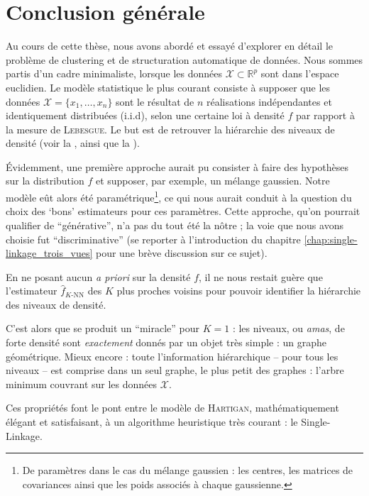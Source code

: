 \chapter{Conclusion générale}
\label{chap:conclusion}

Au cours de cette thèse, nous avons abordé et essayé d'explorer en détail le problème de clustering et de structuration automatique de données.
Nous sommes partis d'un cadre minimaliste, lorsque les données $\mathcal X \subset \mathbb R^p$ sont dans l'espace euclidien. Le modèle statistique le plus courant consiste à supposer que les données $\mathcal X = \bigl\{ x_1, \ldots , x_n \bigr\}$ sont le résultat de $n$ réalisations indépendantes et identiquement distribuées (i.i.d), selon une certaine loi à densité $f$ par rapport à la mesure de \textsc{Lebesgue}.
Le but est de retrouver la hiérarchie des niveaux de densité (voir la , ainsi que la ).

Évidemment, une première approche aurait pu consister à faire des hypothèses sur la distribution $f$ et supposer, par exemple, un mélange gaussien. Notre modèle eût alors été paramétrique\footnote{De paramètres dans le cas du mélange gaussien : les centres, les matrices de covariances ainsi que les poids associés à chaque gaussienne.}, ce qui nous aurait conduit à la question du choix des `bons' estimateurs pour ces paramètres.
Cette approche, qu'on pourrait qualifier de ``générative'', n'a pas du tout été la nôtre ; la voie que nous avons choisie fut ``discriminative'' (se reporter à l’introduction du chapitre \ref{chap:single-linkage_trois_vues} pour une brève discussion sur ce sujet).

En ne posant aucun \emph{a priori} sur la densité $f$, il ne nous restait guère que l'estimateur $\widehat f_ {K\text{-NN}}$ des $K$ plus proches voisins pour pouvoir identifier la hiérarchie des niveaux de densité.

C'est alors que se produit un ``miracle'' pour $K=1$ : les niveaux, ou \emph{amas}, de forte densité sont \emph{exactement} donnés par un objet très simple : un graphe géométrique. 
Mieux encore : toute l'information hiérarchique -- pour tous les niveaux -- est comprise dans un seul graphe, le plus petit des graphes : l'arbre minimum couvrant sur les données $\mathcal X$.

Ces propriétés font le pont entre le modèle de \textsc{Hartigan}, mathématiquement élégant et satisfaisant, à un algorithme heuristique très courant : le Single-Linkage.

